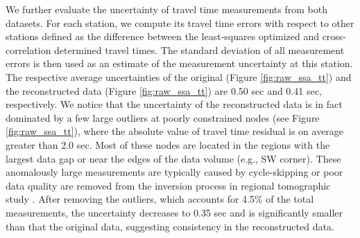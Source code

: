 We further evaluate the uncertainty of travel time measurements from both datasets. For each station, we compute its travel time errors with respect to other stations defined as the difference between the least-squares optimized and cross-correlation determined travel times. The standard deviation of all measurement errors is then used as an estimate of the measurement uncertainty at this station. The respective average uncertainties of the original (Figure \ref{fig:raw_ssa_tt}\color{blue}{(a)}\color{black}{}) and the reconstructed data (Figure \ref{fig:raw_ssa_tt}\color{blue}{(b)}\color{black}{}) are 0.50 sec and 0.41 sec, respectively. We notice that the uncertainty of the reconstructed data is in fact dominated by a few large outliers at poorly constrained nodes (see Figure \ref{fig:raw_ssa_tt}\color{blue}{(b)}\color{black}{}), where the absolute value of travel time residual is on average greater than 2.0 sec. Most of these nodes are located in the regions with the largest data gap or near the edges of the data volume (e.g., SW corner). These anomalously large measurements are typically caused by cycle-skipping or poor data quality are removed from the inversion process in regional tomographic study \cite[]{chen2017finite}. After removing the outliers, which accounts for 4.5\% of the total measurements, the  uncertainty decreases to 0.35 sec and is significantly smaller than that  the original data, suggesting   consistency in the reconstructed data.

